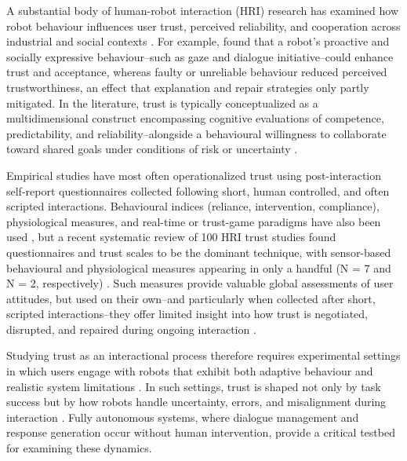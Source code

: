 \documentclass[
  authoryear,
  doubleblind,
  3p]{elsarticle}
\begin{document}
A substantial body of human-robot interaction (HRI) research has
examined how robot behaviour influences user trust, perceived
reliability, and cooperation across industrial and social contexts
\citep{hancock2011}. For example, \citet{babel2021} found that a robot's
proactive and socially expressive behaviour--such as gaze and dialogue
initiative--could enhance trust and acceptance, whereas faulty or
unreliable behaviour reduced perceived trustworthiness, an effect that
explanation and repair strategies only partly mitigated. In the
literature, trust is typically conceptualized as a multidimensional
construct encompassing cognitive evaluations of competence,
predictability, and reliability--alongside a behavioural willingness to
collaborate toward shared goals under conditions of risk or uncertainty
\citep{diab2025, muir1994, devisser2020}.

Empirical studies have most often operationalized trust using
post-interaction self-report questionnaires collected following short,
human controlled, and often scripted interactions. Behavioural indices
(reliance, intervention, compliance), physiological measures, and
real-time or trust-game paradigms have also been used
\citep{loizaga2024}, but a recent systematic review of 100 HRI trust
studies found questionnaires and trust scales to be the dominant
technique, with sensor-based behavioural and physiological measures
appearing in only a handful (N = 7 and N = 2, respectively)
\citep{campagna2025}. Such measures provide valuable global assessments
of user attitudes, but used on their own--and particularly when
collected after short, scripted interactions--they offer limited insight
into how trust is negotiated, disrupted, and repaired during ongoing
interaction \citep{wischnewski2023}.

Studying trust as an interactional process therefore requires
experimental settings in which users engage with robots that exhibit
both adaptive behaviour and realistic system limitations
\citep{campagna2025}. In such settings, trust is shaped not only by task
success but by how robots handle uncertainty, errors, and misalignment
during interaction \citep{diab2025}. Fully autonomous systems, where
dialogue management and response generation occur without human
intervention, provide a critical testbed for examining these dynamics.
\end{document}
